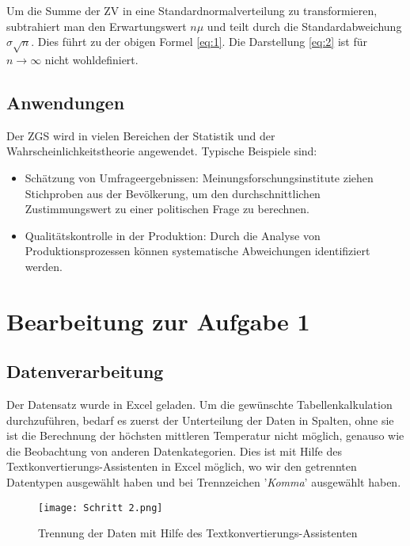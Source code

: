 \documentclass{article}
\begin{document}
Um die Summe der ZV in eine Standardnormalverteilung zu transformieren, subtrahiert man den Erwartungswert \( n\mu \) und teilt durch die Standardabweichung \( \sigma\sqrt{n} \). Dies führt zu der obigen Formel \eqref{eq:1}. Die Darstellung \eqref{eq:2} ist für \( n \to \infty \) nicht wohldefiniert.

\subsection{Anwendungen}

Der ZGS wird in vielen Bereichen der Statistik und der Wahrscheinlichkeitstheorie angewendet. Typische Beispiele sind:
\begin{itemize}
    \item Schätzung von Umfrageergebnissen: Meinungsforschungsinstitute ziehen Stichproben aus der Bevölkerung, um den durchschnittlichen Zustimmungswert zu einer politischen Frage zu berechnen.
    \item Qualitätskontrolle in der Produktion: Durch die Analyse von Produktionsprozessen können systematische Abweichungen identifiziert werden.
    
\end{itemize}

\section{Bearbeitung zur Aufgabe 1}

\subsection{Datenverarbeitung}

Der Datensatz wurde in Excel geladen. Um die gewünschte Tabellenkalkulation durchzuführen, bedarf es zuerst der Unterteilung der Daten in Spalten, ohne sie ist die Berechnung der höchsten mittleren Temperatur nicht möglich, genauso  wie die Beobachtung von anderen Datenkategorien. Dies ist mit Hilfe des Textkonvertierungs-Assistenten in Excel möglich, wo wir den getrennten Datentypen ausgewählt haben und bei Trennzeichen '\textit{Komma}' ausgewählt haben. 

\begin{figure}[ht] 
    \centering
    \texttt{[image: Schritt 2.png]}
    \caption{Trennung der Daten mit Hilfe des Textkonvertierungs-Assistenten}
    \label{fig:1}
    \end{figure}
\end{document}
